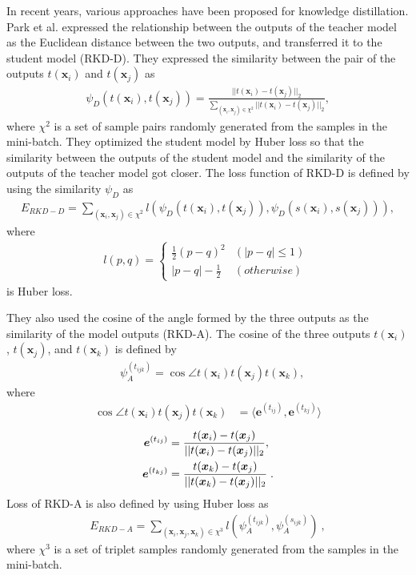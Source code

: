 \documentclass[conference]{IEEEtran}
\begin{document}
In recent years, various approaches have been proposed for knowledge distillation.
Park et al. \cite{Park2019} expressed the relationship between the outputs of the teacher model as the Euclidean distance between the two outputs, and transferred it to the student model (RKD-D).
They expressed the similarity between the pair of the outputs $t(\bm{x}_i)$ and $t(\bm{x}_j)$ as
\begin{align} \label{eq:psiD}
    \psi_D(t(\bm{x}_i), t(\bm{x}_j)) = \frac{||t(\bm{x}_i) - t(\bm{x}_j)||_2}{\sum_{(\bm{x}_i, \bm{x}_j) \in \chi^2} ||t(\bm{x}_i) - t(\bm{x}_j)||_2},
\end{align}
where $\chi^2$ is a set of sample pairs randomly generated from the samples in the mini-batch.
They optimized the student model by Huber loss so that the similarity between the outputs of the student model and the similarity of the outputs of the teacher model got closer.
The loss function of RKD-D is defined by using the similarity $\psi_D$ as
\begin{align} \label{eq:RKD-Dloss}
    E_{RKD-D} = \sum_{(\bm{x}_i, \bm{x}_j) \in \chi^2}l(\psi_D(t(\bm{x}_i), t(\bm{x}_j)), \psi_D(s(\bm{x}_i), s(\bm{x}_j))),
\end{align}
where
\begin{eqnarray} \label{eq:Huber}
l(p,q)=\left\{
\begin{array}{ll}
\frac{1}{2}(p-q)^2 & (|p-q| \leq 1) \\
|p-q|-\frac{1}{2} & (otherwise)
\end{array}
\right. \; 
\end{eqnarray} 
is Huber loss.

They also used the cosine of the angle formed by the three outputs as the similarity of the model outputs (RKD-A).
The cosine of the three outputs $t(\bm{x}_i)$, $t(\bm{x}_j)$, and  $t(\bm{x}_k)$ is defined by
\begin{align} \label{eq:psiA}
    &\psi_A^{(t_{ijk})} = \cos \angle t(\bm{x}_i) t(\bm{x}_j) t(\bm{x}_k),
\end{align}
where
\begin{align} \label{eq:psiA-cos}
 \cos \angle t(\bm{x}_i) t(\bm{x}_j) t(\bm{x}_k) &= \langle \bm{e}^{(t_{ij})}, \bm{e}^{(t_{kj})} \rangle
\end{align}
\begin{align}
    \bm{e}^{(t_{ij})} &= \frac{t(\bm{x}_i) - t(\bm{x}_j)}{||t(\bm{x}_i) - t(\bm{x}_j)||_2}, \notag \\ \bm{e}^{(t_{kj})} &= \frac{t(\bm{x}_k) - t(\bm{x}_j)}{||t(\bm{x}_k) - t(\bm{x}_j)||_2} \; .
\end{align}
Loss of RKD-A is also defined by using Huber loss \cite{Huber1992} as
\begin{align} \label{eq:RKD-Aloss}
E_{RKD-A} = \sum_{(\bm{x}_i, \bm{x}_j, \bm{x}_k) \in \chi^3}l(\psi_A^{(t_{ijk})}, \psi_A^{(s_{ijk})}) \: ,
\end{align}
where $\chi^3$ is a set of triplet samples randomly generated from the samples in the mini-batch.
\end{document}
